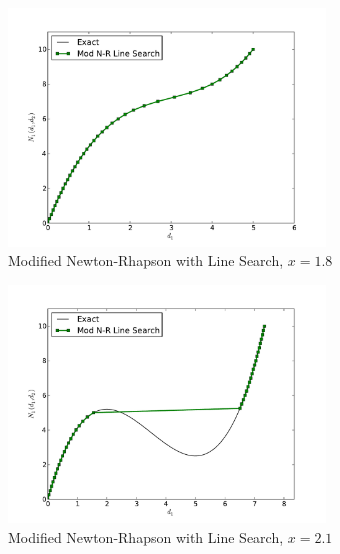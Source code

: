\documentclass[12pt]{article}
\begin{document}
\begin{figure}[h!]
\centering
\includegraphics[width=0.75\textwidth]{MNR_LS18.pdf}
\caption{Modified Newton-Rhapson with Line Search, $x=1.8$}
\end{figure}
\begin{figure}[h!]
\centering
\includegraphics[width=0.75\textwidth]{MNR_LS21.pdf}
\caption{Modified Newton-Rhapson with Line Search, $x=2.1$}
\end{figure}
\end{document}
